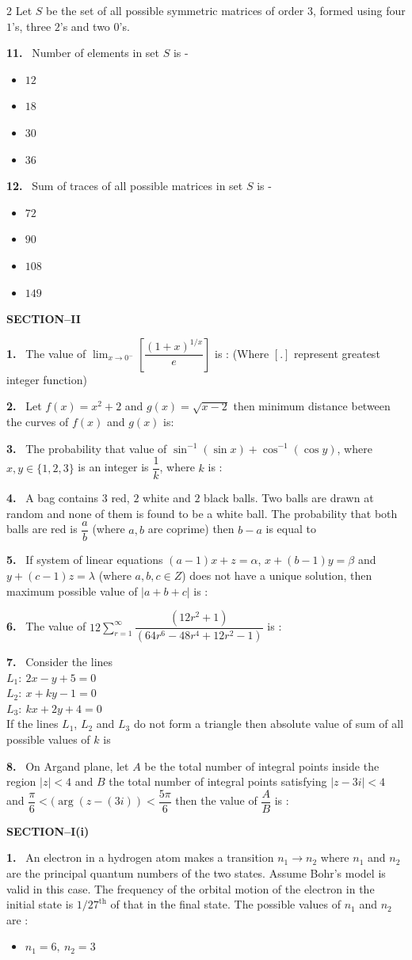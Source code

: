 \documentclass[10pt]{extarticle}
\newcommand{\papersec}[1]{\par\bigskip{\centering\Large\bfseries PAPER-#1\par}\medskip}
\newcommand{\partsec}[2]{\par\medskip\noindent{\large\bfseries PART-#1: #2}\par\smallskip}
\newcommand{\sect}[1]{\par\smallskip\noindent\textbf{#1}\par}
\newcommand{\qn}[1]{\par\smallskip\noindent\textbf{#1.}~}
\newenvironment{qoptions}{\begin{itemize}[leftmargin=1.8em,itemsep=1pt,topsep=2pt,label={}]}{\end{itemize}}
\newcommand{\opt}[2]{\item[(#1)] #2}
\begin{document}
\begin{multicols}{2}
Let $S$ be the set of all possible symmetric matrices of order $3$, formed using four $1$'s, three $2$'s and two $0$'s.
\qn{11} Number of elements in set $S$ is -
\begin{qoptions}
\opt{A}{$12$}
\opt{B}{$18$}
\opt{C}{$30$}
\opt{D}{$36$}
\end{qoptions}
\qn{12} Sum of traces of all possible matrices in set $S$ is -
\begin{qoptions}
\opt{A}{$72$}
\opt{B}{$90$}
\opt{C}{$108$}
\opt{D}{$149$}
\end{qoptions}
\sect{SECTION--II}
\qn{1} The value of $\displaystyle\lim_{x\to0^-}\left[\dfrac{(1+x)^{1/x}}{e}\right]$ is : (Where $[.]$ represent greatest integer function)
\qn{2} Let $f(x)=x^2+2$ and $g(x)=\sqrt{x-2}$ then minimum distance between the curves of $f(x)$ and $g(x)$ is:
\qn{3} The probability that value of $\sin^{-1}(\sin x)+\cos^{-1}(\cos y)$, where $x,y\in\{1,2,3\}$ is an integer is $\dfrac1k$, where $k$ is :
\qn{4} A bag contains $3$ red, $2$ white and $2$ black balls. Two balls are drawn at random and none of them is found to be a white ball. The probability that both balls are red is $\dfrac ab$ (where $a,b$ are coprime) then $b-a$ is equal to
\qn{5} If system of linear equations $(a-1)x+z=\alpha$, $x+(b-1)y=\beta$ and $y+(c-1)z=\lambda$ (where $a,b,c\in Z$) does not have a unique solution, then maximum possible value of $|a+b+c|$ is :
\qn{6} The value of $12\displaystyle\sum_{r=1}^{\infty}\dfrac{(12r^2+1)}{(64r^6-48r^4+12r^2-1)}$ is :
\qn{7} Consider the lines\\
$L_1:\ 2x-y+5=0$\\
$L_2:\ x+ky-1=0$\\
$L_3:\ kx+2y+4=0$\\
If the lines $L_1$, $L_2$ and $L_3$ do not form a triangle then absolute value of sum of all possible values of $k$ is
\qn{8} On Argand plane, let $A$ be the total number of integral points inside the region $|z|<4$ and $B$ the total number of integral points satisfying $|z-3i|<4$ and $\dfrac\pi6<(\arg(z-(3i))<\dfrac{5\pi}6$ then the value of $\dfrac AB$ is :
\papersec{2}
\partsec{1}{PHYSICS}
\sect{SECTION--I(i)}
\qn{1} An electron in a hydrogen atom makes a transition $n_1\to n_2$ where $n_1$ and $n_2$ are the principal quantum numbers of the two states. Assume Bohr's model is valid in this case. The frequency of the orbital motion of the electron in the initial state is $1/27^{\text{th}}$ of that in the final state. The possible values of $n_1$ and $n_2$ are :
\begin{qoptions}
\opt{A}{$n_1=6,\ n_2=3$}

\end{qoptions}
\end{multicols}
\end{document}
